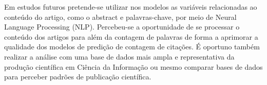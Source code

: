 \documentclass[runningheads]{llncs}
\begin{document}
Em estudos futuros pretende-se utilizar nos modelos as variáveis relacionadas ao conteúdo do artigo, como o abstract e palavras-chave, por meio de Neural Language Processing (NLP). Percebeu-se a oportunidade de se processar o conteúdo dos artigos para além da contagem de palavras de forma a  aprimorar a qualidade dos modelos de predição de contagem de citações. É oportuno também realizar a análise com uma base de dados mais ampla e representativa da produção científica em Ciência da Informação ou mesmo comparar bases de dados para perceber padrões de publicação científica.



\end{document}
